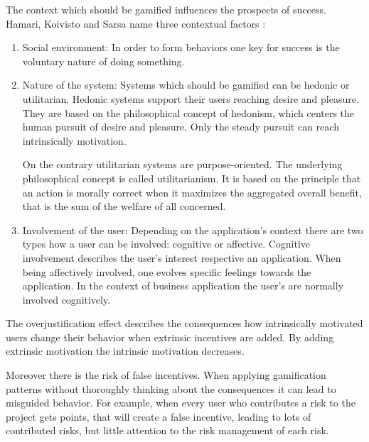 The context which should be gamified influences the prospects of success. Hamari, Koivisto and Sarsa name three contextual factors \cite[p. 3029, 3030]{hamariDoesGamificationWork2014}:
\begin{enumerate}
	\item Social environment: \newline
	In order to form behaviors  one key for success is the voluntary nature of doing something. \cite[p. 3030]{hamariDoesGamificationWork2014}
		
	\item Nature of the system: \newline
	Systems which should be gamified can be hedonic or utilitarian. Hedonic systems support their users reaching desire and pleasure. \cite[p. 3030]{hamariDoesGamificationWork2014}
	They are based on the philosophical concept of hedonism, which centers the human pursuit of desire and pleasure. Only the steady pursuit can reach intrinsically motivation. \cite[p. LV ]{mueller-saloHenrySidgwickUtilitarismus2019}
		
	On the contrary utilitarian systems are purpose-oriented. The underlying philosophical concept is called utilitarianism. It is based on the principle that an action is morally correct when it maximizes the aggregated overall benefit, that is the sum of the welfare of all concerned. \cite[p. 3 ]{mueller-saloHenrySidgwickUtilitarismus2019}
		
	\item Involvement of the user: \newline
	Depending on the application's context there are two types how a user can be involved: cognitive or affective. \cite[p. 3030]{hamariDoesGamificationWork2014} Cognitive involvement describes the user's interest respective an application. When being affectively involved, one evolves specific feelings towards the application. In the context of business application the user's are normally involved cognitively. \cite{zaichkowskyPersonalInvolvementInventory2013}
\end{enumerate}

The overjustification effect describes the consequences how intrinsically motivated users change their behavior when extrinsic incentives are added. By adding extrinsic motivation the intrinsic motivation decreases. \cite[p. 9-13]{bierhoffeditorEnzyklopaediePsychologieSoziale2016}
	
Moreover there is the risk of false incentives. When applying gamification patterns without thoroughly thinking about the consequences it can lead to misguided behavior. For example, when every user who contributes a risk to the project gets points, that will create a false incentive, leading to lots of contributed risks, but little attention to the risk management of each risk. \cite[p.69]{kumarGamificationWorkDesigning2013}
 

